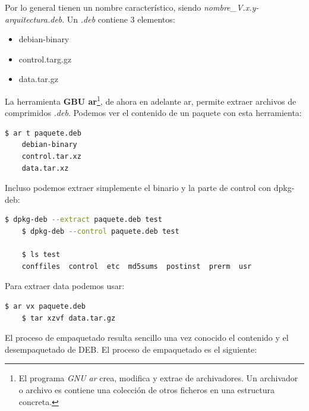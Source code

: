 \documentclass[a4paper, 11pt, titlepage]{article}
\begin{document}
            Por lo general tienen un nombre característico, siendo \textit{nombre\_V.x.y-arquitectura.deb}.
            Un \textit{.deb} contiene 3 elementos:

            \begin{itemize}
                \item debian-binary
                \item control.targ.gz
                \item data.tar.gz
            \end{itemize}

            La herramienta \textbf{GBU ar}\footnote{
                El programa \textit{GNU ar} crea, modifica y extrae de archivadores. Un archivador o archivo 
                es contiene una colección de otros ficheros en una estructura concreta.
            }, de ahora en adelante ar, permite extraer archivos de comprimidos \textit{.deb}. Podemos 
            ver el contenido de un paquete con esta herramienta:

            \begin{lstlisting}[language=bash]
    $ ar t paquete.deb
    debian-binary
    control.tar.xz
    data.tar.xz\end{lstlisting}

            Incluso podemos extraer simplemente el binario y la parte de control con dpkg-deb:

            \begin{lstlisting}[language=bash]
    $ dpkg-deb --extract paquete.deb test
    $ dpkg-deb --control paquete.deb test
    
    $ ls test
    conffiles  control  etc  md5sums  postinst  prerm  usr\end{lstlisting}

            Para extraer data podemos usar:

            \begin{lstlisting}[language=bash]
    $ ar vx paquete.deb
    $ tar xzvf data.tar.gz\end{lstlisting}

            El proceso de empaquetado resulta sencillo una vez conocido el contenido y el desempaquetado 
            de DEB. El proceso de empaquetado es el siguiente:
\end{document}
